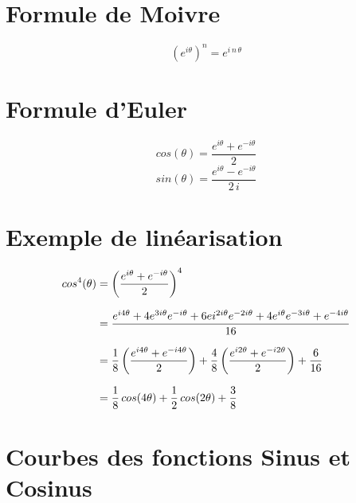 \vfill

\section*{Formule de Moivre}

$$ (e^{i\theta})^n = e^{i\,n\,\theta} $$

\section*{Formule d'Euler}

\begin{center}
	$$ cos(\theta) = \dfrac{e^{i\theta}+e^{-i\theta}}{2} $$
	$$ sin(\theta) = \dfrac{e^{i\theta}-e^{-i\theta}}{2\,i} $$
\end{center}

\section*{Exemple de linéarisation}

\begin{equation*}
	\setlength{\jot}{10pt}
	\begin{split}
	cos^4(\theta) & = \left(\dfrac{e^{i\theta}+e^{-i\theta}}{2}\right)^4\\
				  & = \dfrac{ e^{i4\theta} + 4e^{3i\theta}e^{-i\theta} + 6ei^{2i\theta}e^{-2i\theta} + 4e^{i\theta}e^{-3i\theta} + e^{-4i\theta}}{16} \\
				  & = \dfrac{1}{8}\left(\dfrac{ e^{i4\theta} +  e^{-i4\theta}}{2}\right) +  \dfrac{4}{8}\left(\dfrac{e^{i2\theta}+e^{-i2\theta}}{2}\right) + \dfrac{6}{16}\\
				  & = \dfrac{1}{8}\,cos(4\theta) + \dfrac{1}{2}\,cos(2\theta) + \dfrac{3}{8} \\
	\end{split}
\end{equation*}

\vfill

\pagebreak

\section*{Courbes des fonctions Sinus et Cosinus}


